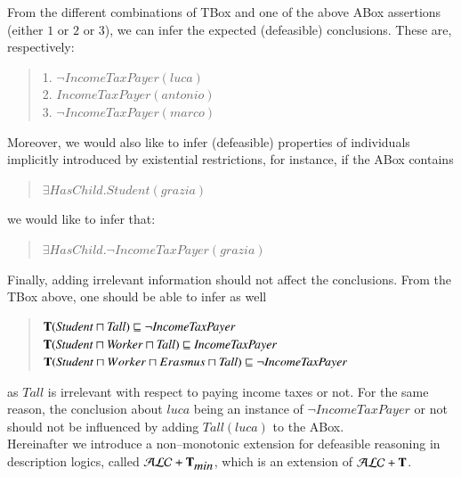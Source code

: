 \documentclass[a4paper, 11pt, oneside]{elsarticle}
\newcommand{\tip}{{\bf T}}
\newcommand{\alct}{\mathcal{ALC}+\tip}
\newcommand{\alctmin}{\mathcal{ALC}+\tip_{\mbox{\em min}}}
\newcommand{\sqset}{\sqsubseteq}
\newcommand{\mint}{\sqcap}
\begin{document}
\noindent From the different combinations of TBox and one of the above ABox assertions (either $1$ or $2$ or $3$), we can infer the expected (defeasible) conclusions. These are, respectively:

\begin{quote}
1. $\mathit{\neg IncomeTaxPayer}(\mathit{luca})$\\
2. $\mathit{IncomeTaxPayer}(\mathit{antonio})$ \\
3. $\mathit{\neg IncomeTaxPayer}(\mathit{marco})$
\end{quote}

\noindent Moreover, we would also like to infer (defeasible) properties of individuals
implicitly introduced by existential restrictions, for instance,
if the ABox contains

\begin{quote}
$\exists \mathit{HasChild}.\mathit{Student(grazia)}$
\end{quote}

\noindent we would like to infer that:
\begin{quote}
$\exists \mathit{HasChild.\neg IncomeTaxPayer(grazia)}$
\end{quote}

\noindent Finally, adding irrelevant information should not affect the conclusions. From the TBox above, one should be able to infer as well

\begin{quote}
$\tip (\mathit{Student} \mint \mathit{Tall}) \sqset \mathit{\neg IncomeTaxPayer}$\\
$\tip (\mathit{Student} \mint \mathit{Worker} \mint \mathit{Tall})  \sqset \mathit{IncomeTaxPayer}$ \\
$\tip (\mathit{Student} \mint Worker \mint Erasmus \mint \mathit{Tall})  \sqset \mathit{\neg IncomeTaxPayer}$
\end{quote}

\noindent as  $\mathit{Tall}$ is irrelevant with respect to paying income taxes or not. For the same reason, the conclusion about $\mathit{luca}$ being an instance of $\neg IncomeTaxPayer$ or not should not be influenced by adding $\mathit{Tall}(\mathit{luca})$ to the ABox.\\

Hereinafter we introduce a non--monotonic extension for defeasible reasoning in description logics, called $\alctmin$, which is an extension of $\alct$.


\newpage
\end{document}

